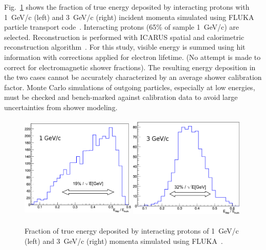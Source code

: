 Fig.~\ref{fig:hadronshwr} shows the fraction of true energy deposited by interacting protons with 1~GeV/c (left) and
3~GeV/c (right) incident momenta simulated using FLUKA particle transport code~\cite{fluka05}. 
Interacting protons (65\% of  sample 1~GeV/c) are selected.
Reconstruction is performed with ICARUS spatial and calorimetric reconstruction algorithm~\cite{icarus_reco}.
For this study, visible energy is summed using hit information with corrections applied for electron lifetime.
(No attempt is made to correct for electromagnetic shower fractions). 
The resulting energy deposition in the two cases cannot be 
accurately characterized by an average shower calibration factor. Monte Carlo simulations of 
outgoing particles, especially at low energies, must be checked and bench-marked against calibration data to avoid
large uncertainties from shower modeling. 
\begin{figure}[h!]
  \centering
\includegraphics[width=0.49\textwidth,height=5.0cm]{figures/pr1GeV_1}
\includegraphics[width=0.49\textwidth,height=5.0cm]{figures/pr3GeV_1}
\label{fig:hadronshwr}
  \caption{Fraction of true energy deposited by interacting protons of 1~GeV/c (left) and
3~GeV/c (right) momenta simulated using FLUKA~\cite{fluka05}.
}
\label{fig:hadronshwr}
\end{figure}

